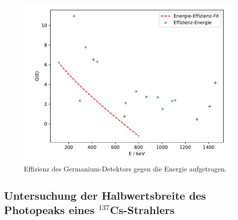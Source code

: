 \FloatBarrier
\begin{figure}
    \centering
    \includegraphics[scale=0.7]{effizienz.pdf}
    \caption{Effizienz des Germanium-Detektors gegen die Energie aufgetragen.}
    \label{abb:effizienz}
\end{figure}
\FloatBarrier
\subsection{Untersuchung der Halbwertsbreite des Photopeaks eines $^{137}$Cs-Strahlers}

